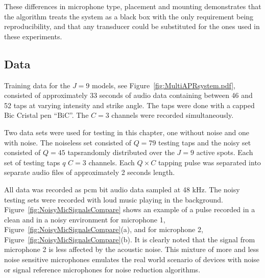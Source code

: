 These differences in microphone type, placement and mounting demonstrates that the algorithm treats the system as a black box with the only requirement being reproducibility, and that any transducer could be substituted for the ones used in these experiments.

\subsection{Data}
Training data for the $J=9$ models, see Figure~\ref{fig:MultiAPRsystem.pdf}, consisted of approximately 33 seconds of audio data containing between 46 and 52 taps at varying intensity and strike angle. The taps were done with a capped Bic Cristal pen ``BiC\textregistered''. The $C=3$ channels were recorded simultaneously.

Two data sets were used for testing in this chapter, one without noise and one with noise. The noiseless set consisted of $Q=79$ testing taps and the noisy set consisted of $Q=45$ taps\DIFdelbegin {}\DIFdelend \DIFaddbegin {}\DIFaddend randomly distributed over the $J=9$ active spots. Each set of testing taps $q$ \DIFdelbegin {}\DIFdelend \DIFaddbegin {}\DIFaddend $C=3$ channels. Each $Q \times C$ tapping pulse was separated into separate audio files of approximately 2 seconds length.

All data was recorded as \DIFdelbegin {}\DIFdelend \DIFaddbegin \gls{pcm}  bit audio data sampled at 48 kHz. The noisy testing sets were recorded with loud music playing in the background. Figure~\ref{fig:NoisyMicSignalsCompare} shows an example of a pulse recorded in a clean and in a noisy environment for microphone 1, Figure~\ref{fig:NoisyMicSignalsCompare}(a), and for microphone 2, Figure~\ref{fig:NoisyMicSignalsCompare}(b). It is clearly noted that the signal from microphone 2 is less affected by the acoustic noise. This mixture of more and less noise sensitive microphones emulates the real world scenario of devices with noise or signal reference microphones for noise reduction algorithms.

